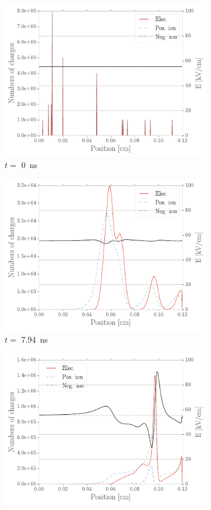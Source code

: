 	\begin{figure}[H]
		\begin{subfigure}{0.5\linewidth}
			\centering
			\includegraphics[width = 0.55\plotwidth]{fig/chapt4/Avalanche_dev_step1.pdf}
			\caption{\label{fig:Avalanche-develop:A} $t=$ \SI{0}{ns}}
		\end{subfigure}
		\begin{subfigure}{0.5\linewidth}
			\centering
			\includegraphics[width = 0.55\plotwidth]{fig/chapt4/Avalanche_dev_step2.pdf}
			\caption{\label{fig:Avalanche-develop:B}$t=$ \SI{7.94}{ns}}
		\end{subfigure}
		\begin{subfigure}{0.5\linewidth}
			\centering
			\includegraphics[width = 0.55\plotwidth]{fig/chapt4/Avalanche_dev_step3.pdf}

\end{subfigure}
\end{figure}
